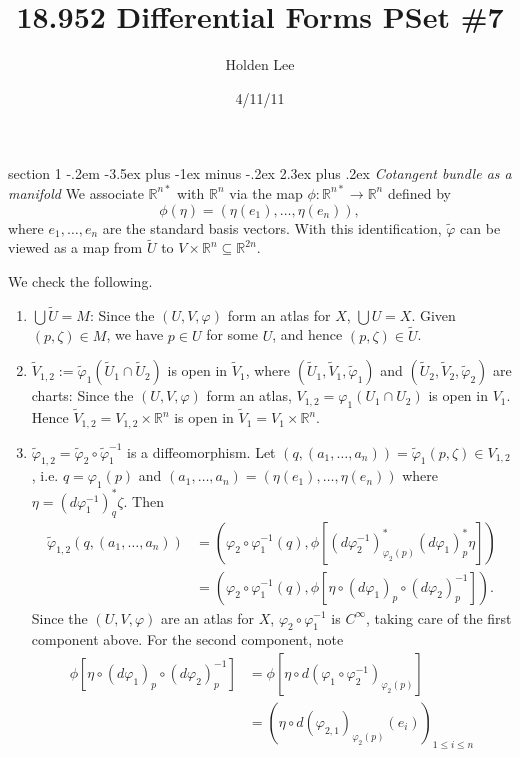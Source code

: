 \documentclass[12pt]{article}
\makeatletter
\theoremstyle{norm}
\newcommand{\R}[0]{\mathbb{R}}
\newcommand{\subeq}[0]{\subseteq}
\newcommand{\ph}[0]{\varphi}
\newcommand{\pa}[1]{\left( {#1} \right)}
\newcommand{\iy}[0]{\infty}
\newenvironment{problem}{\@startsection
       {section}
       {1}
       {-.2em}
       {-3.5ex plus -1ex minus -.2ex}
       {2.3ex plus .2ex}
       {\pagebreak[3]%
       \large\bf\noindent{Problem }
       }
       }
       {%
       }
\makeatother
\begin{document}
\title{18.952 Differential Forms PSet \#7}%
\author{Holden Lee}
\date{4/11/11}%
\maketitle
\thispagestyle{empty}
\begin{problem}{\it Cotangent bundle as a manifold}
We associate $\R^{n*}$ with $\R^n$ via the map $\phi:\R^{n*}\to \R^n$ defined by
\[
\phi(\eta)=(\eta(e_1),\ldots, \eta(e_n)),
\]
where $e_1,\ldots, e_n$ are the standard basis vectors. With this identification, $\tilde{\ph}$ can be viewed as a map from $\tilde{U}$ to $V\times \R^n\subeq \R^{2n}$.

We check the following.
\begin{enumerate}
\item 
$\bigcup \tilde{U}=M$: Since the $(U,V,\ph)$ form an atlas for $X$, $\bigcup U=X$. Given $(p,\zeta)\in M$, we have $p\in U$ for some $U$, and hence $(p,\zeta)\in\tilde{U}$.
\item
$\tilde{V}_{1,2}:=\tilde{\ph}_1 (\tilde{U}_1\cap \tilde{U}_2)$ is open in $\tilde{V}_1$, where $(\tilde{U}_1,\tilde{V}_1, \tilde{\ph}_1)$ and $(\tilde{U}_2,\tilde{V}_2, \tilde{\ph}_2)$ are charts: Since the $(U,V,\ph)$ form an atlas, $V_{1,2}=\ph_1(U_1\cap U_2)$ is open in $V_1$. Hence $\tilde{V}_{1,2}=V_{1,2}\times \R^n$ is open in $\tilde{V}_1=V_1\times \R^n$.
\item 
$\tilde{\ph}_{1,2}=\tilde{\ph}_2\circ \tilde{\ph}_1^{-1}$ is a diffeomorphism. Let $(q, (a_1,\ldots, a_n))=\tilde{\ph}_1(p,\zeta)\in V_{1,2}$, i.e. $q=\ph_1(p)$ and %
$(a_1,\ldots, a_n)=(\eta(e_1),\ldots, \eta(e_n))$ where $\eta=(d\ph_1^{-1})_q^*\zeta$. Then 
\begin{align*}
\tilde{\ph}_{1,2}(q,(a_1,\ldots, a_n))&=(\ph_2\circ \ph_1^{-1}(q),
\phi[ (d\ph_{2}^{-1})_{\ph_2(p)}^* (d\ph_{1})_p^*\eta])\\
&=(\ph_2\circ \ph_1^{-1}(q),\phi[\eta\circ (d\ph_1)_p\circ (d\ph_{2})_p^{-1}]).
\end{align*}
Since the $(U,V,\ph)$ are an atlas for $X$, $\ph_2\circ \ph_1^{-1}$ is $C^{\iy}$, taking care of the first component above. For the second component, note
\begin{align*}
\phi[\eta\circ (d\ph_1)_p\circ (d\ph_{2})_p^{-1}]
&=\phi[\eta \circ d(\ph_1\circ \ph_{2}^{-1})_{\ph_2(p)}]\\
&=\pa{\eta \circ d(\ph_{2,1})_{\ph_2(p)}(e_i)}_{1\le i\le n}\\

\end{align*}
\end{enumerate}
\end{problem}
\end{document}
